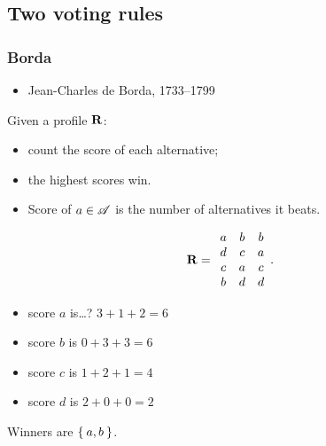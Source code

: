 \documentclass[english]{beamer}
\begin{document}
\subsection{Two voting rules}
\begin{frame}
	\frametitle{Borda}
	
	\begin{itemize}
		\item Jean-Charles de Borda, 1733–1799
	\end{itemize}
Given a profile $\mathbf{R}$:
	\begin{itemize}
		\item count the score of each alternative;
		\item the highest scores win.
		\item Score of $a \in \mathscr{A}$ is the number of alternatives it beats.
	\end{itemize}
	\vspace{-0.7pt}
	
	\begin{equation}
		\mathbf{R} =
		\begin{array}{ccc}
			a	&	b	&	b\\
			d	&	c	&	a\\
			c	&	a	&	c\\
			b	&	d	&	d
		\end{array}.
	\end{equation}
	\begin{minipage}{7cm}
		\begin{itemize}
			\item score $a$ is\dots? \pause $3 + 1 + 2 = 6$
			\item score $b$ is $0 + 3 + 3 = 6$
			\item score $c$ is $1 + 2 + 1 = 4$
			\item score $d$ is $2 + 0 + 0 = 2$
		\end{itemize}
	\end{minipage}%
	\begin{minipage}{4cm}
		Winners are $\Set{a, b}$.
	\end{minipage}
\end{frame}
\end{document}
